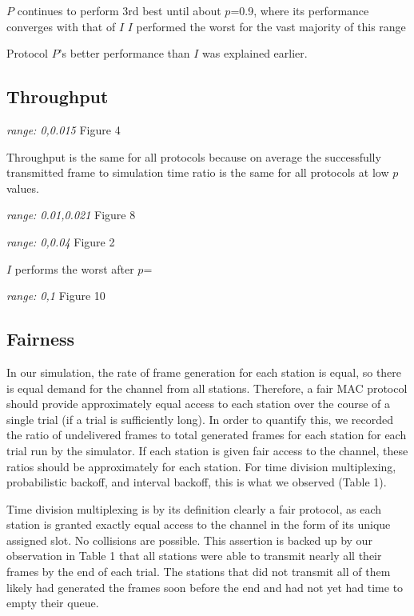 \documentclass[twocolumn]{article}
\begin{document}
$P$ continues to perform 3rd best until about $p$=0.9, where its performance converges with that of $I$
$I$ performed the worst for the vast majority of this range

Protocol $P$'s better performance than $I$ was explained earlier. 

\subsection*{Throughput}

\emph{range: 0,0.015} Figure 4

Throughput is the same for all protocols because on average the successfully transmitted frame to simulation time ratio is the same
for all protocols at low $p$ values. 

\emph{range: 0.01,0.021} Figure 8



\emph{range: 0,0.04} Figure 2

$I$ performs the worst after $p$=

\emph{range: 0,1} Figure 10

\subsection*{Fairness} 

In our simulation, the rate of frame generation for each station is equal, so there is
equal demand for the channel from all stations. Therefore, a fair MAC protocol should provide
approximately equal access to each station over the course of a single trial (if a trial is
sufficiently long). In order to quantify this, we recorded the ratio of undelivered frames
to total generated frames for each station for each trial run by the simulator. If each station
is given fair access to the channel, these ratios should be approximately for each station. For
time division multiplexing, probabilistic backoff, and interval backoff, this is what we 
observed (Table 1).

Time division multiplexing is by its definition clearly a fair protocol, as each station is 
granted exactly equal access to the channel in the form of its unique assigned slot. No 
collisions are possible. This assertion is backed up by our observation in Table 1 that 
all stations were able to transmit nearly all their frames by the end of each trial. The 
stations that did not transmit all of them likely had generated the frames soon before the 
end and had not yet had time to empty their queue.
\end{document}
